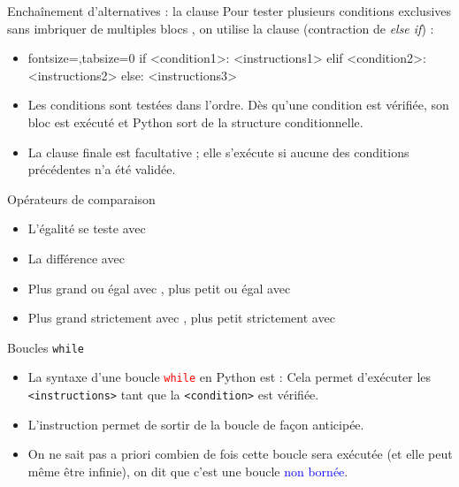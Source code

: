 \documentclass[10pt]{beamer}
\begin{document}
\begin{frame}[fragile]{\Ctitle}{\stitle}
	\begin{alertblock}{Enchaînement d'alternatives : la clause }
		Pour tester plusieurs conditions exclusives sans imbriquer de multiples blocs , on utilise la clause  (contraction de \textit{else if}) :
		\begin{itemize}
			\item<2-> \begin{codepython*}{fontsize=\footnotesize,tabsize=0}
if <condition1>:
    <instructions1>
elif <condition2>:
    <instructions2>
else:
    <instructions3>
			\end{codepython*}
			\item<3-> Les conditions sont testées dans l'ordre. Dès qu'une condition est vérifiée, son bloc est exécuté et Python sort de la structure conditionnelle.
			\item<4-> La clause finale  est facultative ; elle s'exécute si aucune des conditions précédentes n'a été validée.
		\end{itemize}
	\end{alertblock}
\end{frame}

\begin{frame}{\Ctitle}{\stitle}
	\begin{alertblock}{Opérateurs de comparaison}
		\begin{itemize}
			\item<1-> L'égalité se teste avec \kw{==}
			\item<2-> La différence avec \kw{!=}
			\item<3-> Plus grand ou égal avec \kw{>=}, plus petit ou égal avec \kw{<=}
			\item<4-> Plus grand strictement avec \kw{>}, plus petit strictement avec \kw{<}
		\end{itemize}
	\end{alertblock}
\end{frame}

\begin{frame}[fragile]{\Ctitle}{\stitle}
	\begin{alertblock}{Boucles {\tt while}}
		\begin{itemize}
			\item<2-> La syntaxe d'une boucle \textcolor{red}{\tt while} en Python est :
				Cela permet d'exécuter les {\tt <instructions>} tant que la {\tt <condition>} est vérifiée.
			\item<3-> L'instruction  permet de sortir de la boucle de façon anticipée.
			\item<4-> On ne sait pas a priori combien de fois cette boucle sera exécutée (et elle peut même être infinie), on dit que c'est une boucle \textcolor{blue}{non bornée}.
		\end{itemize}
	\end{alertblock}
\end{frame}
\end{document}
